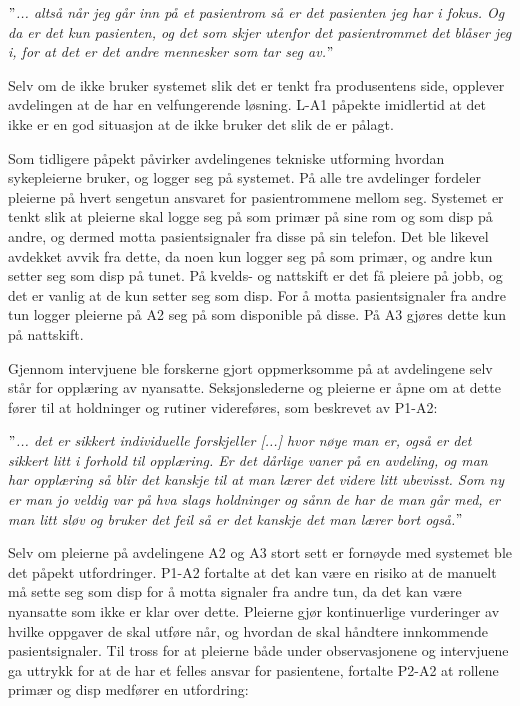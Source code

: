 \noindent
\textit{$"$... altså når jeg går inn på et pasientrom så er det pasienten jeg har i fokus. Og da er det kun pasienten, og det som skjer utenfor det pasientrommet det blåser jeg i, for at det er det andre mennesker som tar seg av.$"$}

\noindent
Selv om de ikke bruker systemet slik det er tenkt fra produsentens side, opplever avdelingen at de har en velfungerende løsning. L-A1 påpekte imidlertid at det ikke er en god situasjon at de ikke bruker det slik de er pålagt.

\noindent
Som tidligere påpekt påvirker avdelingenes tekniske utforming hvordan sykepleierne bruker, og logger seg på systemet. På alle tre avdelinger fordeler pleierne på hvert sengetun ansvaret for pasientrommene mellom seg. Systemet er tenkt slik at pleierne skal logge seg på som primær på sine rom og som disp på andre, og dermed motta pasientsignaler fra disse på sin telefon. Det ble likevel avdekket avvik fra dette, da noen kun logger seg på som primær, og andre kun setter seg som disp på tunet. På kvelds- og nattskift er det få pleiere på jobb, og det er vanlig at de kun setter seg som disp. For å motta pasientsignaler fra andre tun logger pleierne på A2 seg på som disponible på disse. På A3 gjøres dette kun på nattskift. 

\noindent
Gjennom intervjuene ble forskerne gjort oppmerksomme på at avdelingene selv står for opplæring av nyansatte. Seksjonslederne og pleierne er åpne om at dette fører til at holdninger og rutiner videreføres, som beskrevet av P1-A2:

\noindent
\textit{$"$... det er sikkert individuelle forskjeller [...] hvor nøye man er, også er det sikkert litt i forhold til opplæring. Er det dårlige vaner på en avdeling, og man har opplæring så blir det kanskje til at man lærer det videre litt ubevisst. Som ny er man jo veldig var på hva slags holdninger og sånn de har de man går med, er man litt sløv og bruker det feil så er det kanskje det man lærer bort også.$"$}

\noindent
Selv om pleierne på avdelingene A2 og A3 stort sett er fornøyde med systemet ble det påpekt utfordringer. P1-A2 fortalte at det kan være en risiko at de manuelt må sette seg som disp for å motta signaler fra andre tun, da det kan være nyansatte som ikke er klar over dette. Pleierne gjør kontinuerlige vurderinger av hvilke oppgaver de skal utføre når, og hvordan de skal håndtere innkommende pasientsignaler. Til tross for at pleierne både under observasjonene og intervjuene ga uttrykk for at de har et felles ansvar for pasientene, fortalte P2-A2 at rollene primær og disp medfører en utfordring:

